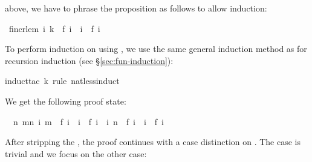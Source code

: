 \begin{isabellebody}
\begin{isamarkuptext}
above, we have to phrase the proposition as follows to allow induction:%
\end{isamarkuptext}%
\isamarkuptrue%
\isamarkupfalse%
\ f{}incr{}lem{}\ {}{}i{}\ k\ {}\ f\ i\ {}\ i\ {}\ f\ i{}%
\isadelimproof
%
\endisadelimproof
%
\isatagproof
%
\begin{isamarkuptxt}%
\noindent
To perform induction on  using , we use
the same general induction method as for recursion induction (see
\S\ref{sec:fun-induction}):%
\end{isamarkuptxt}%
\isamarkuptrue%
\isamarkupfalse%
{}induct{}tac\ k\ rule{}\ nat{}less{}induct{}%
\begin{isamarkuptxt}%
\noindent
We get the following proof state:
\begin{isabelle}%
\ {}{}\ {}n{}\ {}m{}n{}\ {}i{}\ m\ {}\ f\ i\ {}\ i\ {}\ f\ i\ {}\ {}i{}\ n\ {}\ f\ i\ {}\ i\ {}\ f\ i%
\end{isabelle}
After stripping the , the proof continues with a case
distinction on . The case  is trivial and we focus on
the other case:%

\end{isamarkuptxt}
\end{isabellebody}
